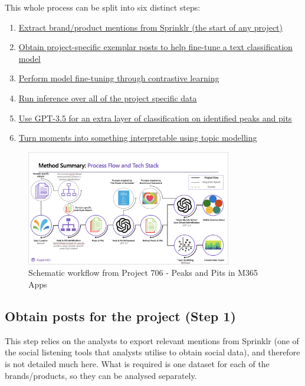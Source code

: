 \documentclass[
  letterpaper,
  DIV=11,
  numbers=noendperiod]{scrreprt}
\providecommand{\tightlist}{%
  \setlength{\itemsep}{0pt}\setlength{\parskip}{0pt}}\usepackage{longtable,booktabs,array}
\begin{document}
This whole process can be split into six distinct steps:

\begin{enumerate}
\def\labelenumi{\arabic{enumi}.}
\tightlist
\item
  \hyperref[step-one]{Extract brand/product mentions from Sprinklr (the
  start of any project)}
\item
  \hyperref[step-two]{Obtain project-specific exemplar posts to help
  fine-tune a text classification model}
\item
  \hyperref[step-three]{Perform model fine-tuning through contrastive
  learning}
\item
  \hyperref[step-four]{Run inference over all of the project specific
  data}
\item
  \hyperref[step-five]{Use GPT-3.5 for an extra layer of classification
  on identified peaks and pits}
\item
  \hyperref[step-six]{Turn moments into something interpretable using
  topic modelling}
\end{enumerate}

\begin{figure}[H]

{\centering \includegraphics[width=0.8\textwidth,height=\textheight]{./img/ar_workflow.png}

}

\caption{Schematic workflow from Project 706 - Peaks and Pits in M365
Apps}

\end{figure}%

\subsection{Obtain posts for the project (Step 1)}\label{step-one}

This step relies on the analysts to export relevant mentions from
Sprinklr (one of the social listening tools that analysts utilise to
obtain social data), and therefore is not detailed much here. What is
required is one dataset for each of the brands/products, so they can be
analysed separately.
\end{document}

